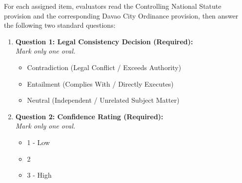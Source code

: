 \noindent For each assigned item, evaluators read the Controlling National Statute provision and the corresponding Davao City Ordinance provision, then answer the following two standard questions:

\begin{enumerate}[leftmargin=1.8em, itemsep=6pt]
    \item \textbf{Question 1: Legal Consistency Decision (Required):}\\
    \textit{Mark only one oval.}
    \begin{itemize}[leftmargin=1.5em, itemsep=2pt]
        \item[$\bigcirc$] Contradiction (Legal Conflict / Exceeds Authority)
        \item[$\bigcirc$] Entailment (Complies With / Directly Executes)
        \item[$\bigcirc$] Neutral (Independent / Unrelated Subject Matter)
    \end{itemize}
    \item \textbf{Question 2: Confidence Rating (Required):}\\
    \textit{Mark only one oval.}
    \begin{itemize}[leftmargin=1.5em, itemsep=2pt]
        \item[$\bigcirc$] 1 - Low
        \item[$\bigcirc$] 2
        \item[$\bigcirc$] 3 - High
    \end{itemize}
\end{enumerate}

\vspace{1em}
\noindent{}
